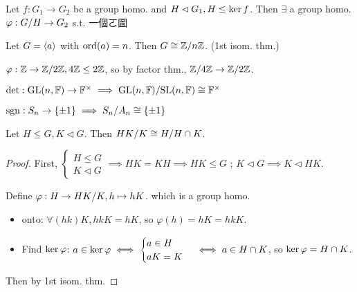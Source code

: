 \begin{theorem}
  Let $f: G_1 \to G_2$ be a group homo. and $H \lhd G_1, H \le \operatorname{ker} f$. Then
  $\exists$ a group homo. $\varphi: {G}/{H} \to G_2$ s.t.
  一個ㄛ圖
\end{theorem}

\begin{example}
  Let $G = \langle a\rangle$ with $\operatorname{ord}(a) = n$. Then $G \cong {\mathbb{Z}}/{n\mathbb{Z}}$.
  (1st isom. thm.)
\end{example}

\begin{example}
  $\varphi: \mathbb{Z} \to {\mathbb{Z}}/{2\mathbb{Z}}, 4\mathbb{Z} \le 2\mathbb{Z}$, so by factor thm.,
  ${\mathbb{Z}}/{4\mathbb{Z}} \to {\mathbb{Z}}/{2\mathbb{Z}}$.
\end{example}

\begin{example}
  $\det: \text{GL}(n, \mathbb{F}) \to \mathbb{F}^\times \implies
  {\text{GL}(n, \mathbb{F})}/{\text{SL}(n, \mathbb{F})} \cong \mathbb{F}^\times$
\end{example}

\begin{example}
  $\operatorname{sgn}: S_n \to \{ \pm 1 \} \implies {S_n}/{A_n} \cong \{ \pm 1 \}$
\end{example}

\begin{theorem}
  Let $H \le G, K \lhd G$. Then ${HK}/{K} \cong {H}/{H\cap K}$.
  \begin{proof}
    First, $\begin{cases}H\le G \\ K \lhd G\end{cases} \implies HK = KH
      \implies HK \le G$ ; $K \lhd G \implies K \lhd HK$.

    Define $\varphi: H \to {HK}/{K}, h \mapsto hK$. which is a group homo.
    \begin{itemize}
      \item onto: $\forall (hk) K, hkK = hK$, so $\varphi(h) = hK = hkK$.
      \item Find $\operatorname{ker} \varphi$: $a \in \operatorname{ker} \varphi \iff \begin{cases}
          a \in H \\
          aK = K
        \end{cases} \iff a \in H \cap K$, so $\operatorname{ker} \varphi = H\cap K$.
    \end{itemize}
    Then by 1st isom. thm.
  \end{proof}
\end{theorem}

